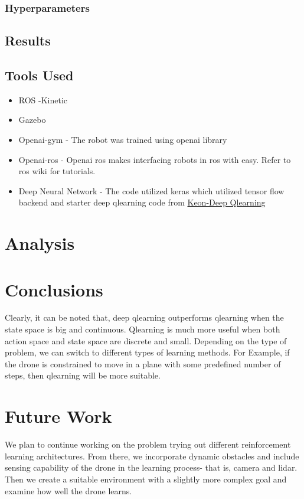 \documentclass[12pt]{article}
\begin{document}
\subsubsection{Hyperparameters}
\subsection{Results}

\subsection{Tools Used}
\begin{itemize}
  \item ROS -Kinetic
  \item Gazebo 
  \item Openai-gym - The robot was trained using openai library
  \item Openai-ros - Openai ros makes interfacing robots in ros with easy. Refer to ros wiki for tutorials. 
  \item Deep Neural Network - The code utilized keras which utilized tensor flow backend and starter deep qlearning code 
    from \href{https://github.com/keon/deep-q-learning/blob/master/dqn.py}{Keon-Deep Qlearning}
\end{itemize}
\section{Analysis}
\section{Conclusions}
Clearly, it can be noted that, deep qlearning outperforms qlearning when the state space is big and continuous. Qlearning is much more useful
when both action space and state space are discrete and small. Depending on the type of problem, we can switch to different types of learning
methods. For Example, if the drone is constrained to move in a plane with some predefined number of steps, then qlearning will be more suitable.

\section{Future Work}
We plan to continue working on the problem trying out different reinforcement learning architectures. From there, we incorporate 
dynamic obstacles and include sensing capability of the drone in the learning process- that is, camera and lidar. Then we create a suitable
environment with a slightly more complex goal and examine how well the drone learns.
\end{document}
